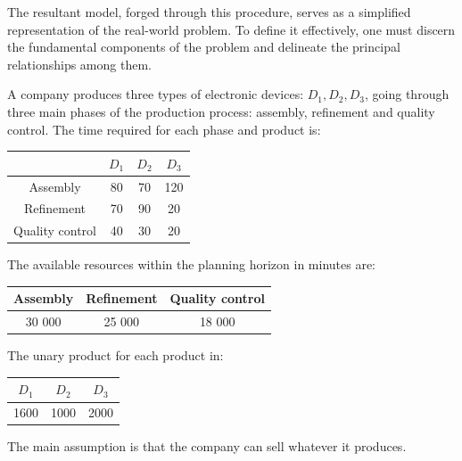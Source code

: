 \documentclass[12pt, a4paper]{report}
\begin{document}
    The resultant model, forged through this procedure, serves as a simplified representation of the real-world problem. 
    To define it effectively, one must discern the fundamental components of the problem and delineate the principal relationships among them.
    \begin{example}
        A company produces three types of electronic devices: $D_1,D_2,D_3$, going through three main phases of the production process: assembly, refinement and quality control.
        The time required for each phase and product is: 
        \begin{table}[H]
            \centering
            \begin{tabular}{c|ccc|}
            \cline{2-4}
            \textbf{}                             & \textbf{$D_1$} & \textbf{$D_2$} & $D_3$ \\ \hline
            \multicolumn{1}{|c|}{Assembly}        & 80             & 70             & 120   \\
            \multicolumn{1}{|c|}{Refinement}      & 70             & 90             & 20    \\
            \multicolumn{1}{|c|}{Quality control} & 40             & 30             & 20    \\ \hline
            \end{tabular}
        \end{table}
        The available resources within the planning horizon in minutes are: 
        \begin{table}[H]
            \centering
            \begin{tabular}{|c|c|c|}
            \hline
            \textbf{Assembly} & \textbf{Refinement} & \textbf{Quality control} \\ \hline
            30 000            & 25 000              & 18 000                   \\ \hline
            \end{tabular}
        \end{table}
        The unary product for each product in: 
        \begin{table}[H]
            \centering
            \begin{tabular}{|c|c|c|}
            \hline
            $D_1$          & $D_2$          & $D_3$ \\ \hline
            1600           & 1000           & 2000  \\ \hline
            \end{tabular}
        \end{table}
        The main assumption is that the company can sell whatever it produces. 


\end{example}
\end{document}
